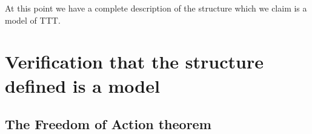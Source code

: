 \documentclass{article}
\theoremstyle{definition}
\newtheorem{definition}[theorem]{Definition}
\theoremstyle{remark}
\newcommand{\ihref}[1]{(\textbf{I\ref{#1}})}
\begin{document}
\begin{comment}

\begin{definition}[position functions]

The conditions constraining the choice of functions $\iota^+_\beta$
({enforcing }\ihref{ih:position}, \ihref{ih:pos_typed_near_litter}, \ihref{ih:position_constraints}) are

\begin{enumerate}

\item $\iota_*(t) < \iota^+_\beta(x,S)$ if $(t,A)$ is in the range of $S$ and $x$ is not a typed near-litter {\ihref{ih:position_constraints}}.

\item $\iota_*(N) \leq \iota^+_\beta(N_\beta,S)$ for any near-litter $N$ and support $S$ of $N$
\ihref{ih:pos_typed_near_litter}.

\end{enumerate}

We then define $x \leq^+_\beta y$ as $\iota^+_\beta(x) \leq \iota^+_\beta(y)$.
\end{definition}

There is no difficulty in satisfying these constraints {given that $\tau_\beta^+$ has size $\mu$ \ihref{ih:cardinality}} as there are only a small set of constraints on any particular value of $\iota_*^+$ and $\mu$ is of cofinality at least $\kappa$.

\end{comment}





At this point we have a complete description of the structure which we claim is a model of TTT.



\newpage

\section{Verification that the structure defined is a model}\label{s:verification}

\subsection{The Freedom of Action theorem}\label{ss:foa}
\end{document}
